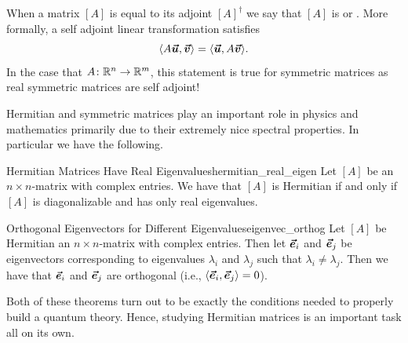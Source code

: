             When a matrix $[A]$ is equal to its adjoint $[A]^\dagger$ we say that $[A]$ is  or .  More formally, a self adjoint linear transformation satisfies
            \[
                \langle A \boldsymbol{\boldsymbol{\vec{u}}}, \boldsymbol{\boldsymbol{\vec{v}}} \rangle = \langle \boldsymbol{\boldsymbol{\vec{u}}},A\boldsymbol{\boldsymbol{\vec{v}}} \rangle.
            \]
            In the case that $A\colon \mathbb{R}^n \to \mathbb{R}^m$, this statement is true for symmetric matrices as real symmetric matrices are self adjoint!

            Hermitian and symmetric matrices play an important role in physics and mathematics primarily due to their extremely nice spectral properties.  In particular we have the following.
            
            \begin{thm}{Hermitian Matrices Have Real Eigenvalues}{hermitian_real_eigen}
                Let $[A]$ be an $n\times n$-matrix with complex entries. We have that $[A]$ is Hermitian if and only if $[A]$ is diagonalizable and has only real eigenvalues.
            \end{thm}
            
            \begin{thm}{Orthogonal Eigenvectors for Different Eigenvalues}{eigenvec_orthog}
                Let $[A]$ be Hermitian an $n\times n$-matrix with complex entries.  Then let $\boldsymbol{\vec{e}}_i$ and $\boldsymbol{\vec{e}}_j$ be eigenvectors corresponding to eigenvalues $\lambda_i$ and $\lambda_j$ such that $\lambda_i \neq \lambda_j$. Then we have that $\boldsymbol{\vec{e}}_i$ and $\boldsymbol{\vec{e}}_j$ are orthogonal (i.e., $\langle \boldsymbol{\vec{e}}_i, \boldsymbol{\vec{e}}_j\rangle=0$).
            \end{thm}
            
            Both of these theorems turn out to be exactly the conditions needed to properly build a quantum theory. Hence, studying Hermitian matrices is an important task all on its own.  
            
